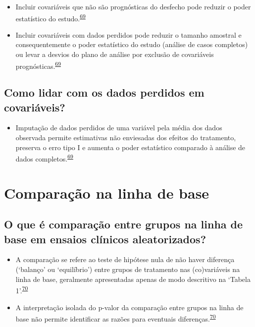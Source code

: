 \documentclass[
]{book}
\providecommand{\tightlist}{%
  \setlength{\itemsep}{0pt}\setlength{\parskip}{0pt}}
\begin{document}
\begin{itemize}
\item
  Incluir covariáveis que não são prognósticas do desfecho pode reduzir o poder estatístico do estudo.\textsuperscript{\protect\hyperlink{ref-Kahan2014}{69}}
\item
  Incluir covariáveis com dados perdidos pode reduzir o tamanho amostral e consequentemente o poder estatístico do estudo (análise de casos completos) ou levar a desvios do plano de análise por exclusão de covariáveis prognósticas.\textsuperscript{\protect\hyperlink{ref-Kahan2014}{69}}
\end{itemize}

\hypertarget{como-lidar-com-os-dados-perdidos-em-covariuxe1veis}{%
\subsection{Como lidar com os dados perdidos em covariáveis?}\label{como-lidar-com-os-dados-perdidos-em-covariuxe1veis}}

\begin{itemize}
\tightlist
\item
  Imputação de dados perdidos de uma variável pela média dos dados observada permite estimativas não enviesadas dos efeitos do tratamento, preserva o erro tipo I e aumenta o poder estatístico comparado à análise de dados completos.\textsuperscript{\protect\hyperlink{ref-Kahan2014}{69}}
\end{itemize}

\hypertarget{comparacao-linha-de-base}{%
\section{Comparação na linha de base}\label{comparacao-linha-de-base}}

\hypertarget{o-que-uxe9-comparauxe7uxe3o-entre-grupos-na-linha-de-base-em-ensaios-cluxednicos-aleatorizados}{%
\subsection{O que é comparação entre grupos na linha de base em ensaios clínicos aleatorizados?}\label{o-que-uxe9-comparauxe7uxe3o-entre-grupos-na-linha-de-base-em-ensaios-cluxednicos-aleatorizados}}

\begin{itemize}
\item
  A comparação se refere ao teste de hipótese nula de não haver diferença (`balanço' ou `equilíbrio') entre grupos de tratamento nas (co)variáveis na linha de base, geralmente apresentadas apenas de modo descritivo na `Tabela 1'.\textsuperscript{\protect\hyperlink{ref-Stang2018}{70}}
\item
  A interpretação isolada do p-valor da comparação entre grupos na linha de base não permite identificar as razões para eventuais diferenças.\textsuperscript{\protect\hyperlink{ref-Stang2018}{70}}
\end{itemize}
\end{document}

